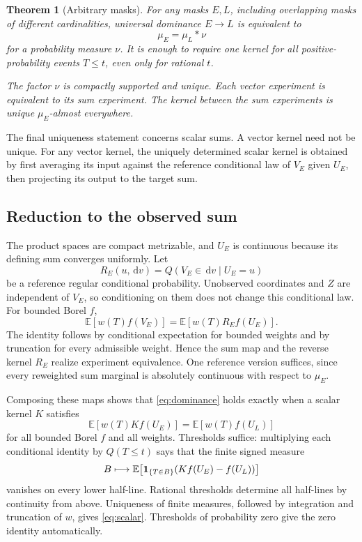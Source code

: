 \documentclass[11pt,a4paper]{article}
\newtheorem{theorem}{Theorem}[section]\newtheorem{lemma}[theorem]{Lemma}
\theoremstyle{remark}\newtheorem*{ednote}{Editorial note (ProveIt, 2026-10-01)}
\newcommand{\E}{\mathbb E}\newcommand{\R}{\mathbb R}\newcommand{\C}{\mathbb C}\newcommand{\N}{\mathbb N}
\newcommand{\dd}{\,\mathrm d}\newcommand{\ii}{\mathrm i}
\begin{document}
\begin{theorem}[Arbitrary masks]\label{thm:general}
For any masks $E,L$, including overlapping masks of different cardinalities, universal dominance $E\to L$ is equivalent to
\begin{equation}\label{eq:conv}
 \mu_E=\mu_L*\nu
\end{equation}
for a probability measure $\nu$. It is enough to require one kernel for all positive-probability events $T\le t$, even only for rational $t$.

The factor $\nu$ is compactly supported and unique. Each vector experiment is equivalent to its sum experiment. The kernel between the sum experiments is unique $\mu_E$-almost everywhere.
\end{theorem}

The final uniqueness statement concerns scalar sums. A vector kernel need not be unique. For any vector kernel, the uniquely determined scalar kernel is obtained by first averaging its input against the reference conditional law of $V_E$ given $U_E$, then projecting its output to the target sum.

\subsection{Reduction to the observed sum}
The product spaces are compact metrizable, and $U_E$ is continuous because its defining sum converges uniformly. Let
\[
 R_E(u,\dd v)=Q(V_E\in\dd v\mid U_E=u)
\]
be a reference regular conditional probability. Unobserved coordinates and $Z$ are independent of $V_E$, so conditioning on them does not change this conditional law. For bounded Borel $f$,
\begin{equation}\label{eq:sufficiency}
 \E[w(T)f(V_E)]=\E[w(T)R_Ef(U_E)].
\end{equation}
The identity follows by conditional expectation for bounded weights and by truncation for every admissible weight. Hence the sum map and the reverse kernel $R_E$ realize experiment equivalence. One reference version suffices, since every reweighted sum marginal is absolutely continuous with respect to $\mu_E$.

Composing these maps shows that \eqref{eq:dominance} holds exactly when a scalar kernel $K$ satisfies
\begin{equation}\label{eq:scalar}
 \E[w(T)Kf(U_E)]=\E[w(T)f(U_L)]
\end{equation}
for all bounded Borel $f$ and all weights. Thresholds suffice: multiplying each conditional identity by $Q(T\le t)$ says that the finite signed measure
\[
 B\longmapsto\E\bigl[\ind_{\{T\in B\}}(Kf(U_E)-f(U_L))\bigr]
\]
vanishes on every lower half-line. Rational thresholds determine all half-lines by continuity from above. Uniqueness of finite measures, followed by integration and truncation of $w$, gives \eqref{eq:scalar}. Thresholds of probability zero give the zero identity automatically.
\end{document}
